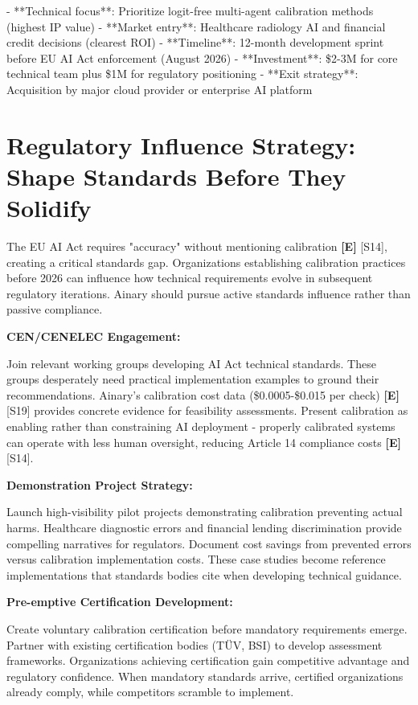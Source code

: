 \documentclass[a4paper,11pt]{article}
\newcommand{\elabel}{\textbf{\textcolor{ecolor}{[E]}}}
\begin{document}
\begin{decisionbox}
- **Technical focus**: Prioritize logit-free multi-agent calibration methods (highest IP value)
- **Market entry**: Healthcare radiology AI and financial credit decisions (clearest ROI)
- **Timeline**: 12-month development sprint before EU AI Act enforcement (August 2026)
- **Investment**: \$2-3M for core technical team plus \$1M for regulatory positioning
- **Exit strategy**: Acquisition by major cloud provider or enterprise AI platform
\end{decisionbox}


\section{Regulatory Influence Strategy: Shape Standards Before They Solidify}

The EU AI Act requires "accuracy" without mentioning calibration \elabel{} \textcolor{primary}{[S14]}, creating a critical standards gap. Organizations establishing calibration practices before 2026 can influence how technical requirements evolve in subsequent regulatory iterations. Ainary should pursue active standards influence rather than passive compliance.


\textbf{CEN/CENELEC Engagement:}\par
Join relevant working groups developing AI Act technical standards. These groups desperately need practical implementation examples to ground their recommendations. Ainary's calibration cost data (\$0.0005-\$0.015 per check) \elabel{} \textcolor{primary}{[S19]} provides concrete evidence for feasibility assessments. Present calibration as enabling rather than constraining AI deployment - properly calibrated systems can operate with less human oversight, reducing Article 14 compliance costs \elabel{} \textcolor{primary}{[S14]}.


\textbf{Demonstration Project Strategy:}\par
Launch high-visibility pilot projects demonstrating calibration preventing actual harms. Healthcare diagnostic errors and financial lending discrimination provide compelling narratives for regulators. Document cost savings from prevented errors versus calibration implementation costs. These case studies become reference implementations that standards bodies cite when developing technical guidance.


\textbf{Pre-emptive Certification Development:}\par
Create voluntary calibration certification before mandatory requirements emerge. Partner with existing certification bodies (TÜV, BSI) to develop assessment frameworks. Organizations achieving certification gain competitive advantage and regulatory confidence. When mandatory standards arrive, certified organizations already comply, while competitors scramble to implement.
\end{document}

